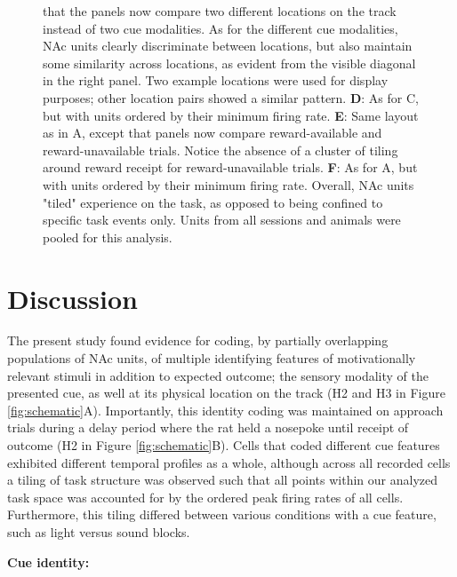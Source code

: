 \documentclass[11pt]{article}
\newcommand{\bsf}[1]{\textbf{#1}}
\begin{document}
{\begin{figure}[h]
{  that the panels now compare two different locations on the track instead of
  two cue modalities. As for the different cue modalities, NAc units clearly
  discriminate between locations, but also maintain some similarity across
  locations, as evident from the visible diagonal in the right panel. Two
  example locations were used for display purposes; other location pairs showed
  a similar pattern. \bsf{D}: As for C, but with units ordered by their minimum
  firing rate. \bsf{E}: Same layout as in A, except that panels now compare
  reward-available and reward-unavailable trials. Notice the absence of a
  cluster of tiling around reward receipt for reward-unavailable
  trials. \bsf{F}: As for A, but with units ordered by their minimum firing
  rate. Overall, NAc units "tiled" experience on the task, as opposed to being
  confined to specific task events only. Units from all sessions and animals
  were pooled for this analysis.}
\label{fig:NP_tiling}
\end{figure}

\section*{Discussion}

The present study found evidence for coding, by partially overlapping populations of NAc units, of multiple identifying features of motivationally relevant stimuli in addition to expected outcome; the sensory modality of the presented cue, as well at its physical location on the track (H2 and H3 in Figure \ref{fig:schematic}A). Importantly, this identity coding was maintained on approach trials during a delay period where the rat held a nosepoke until receipt of outcome (H2 in Figure \ref{fig:schematic}B). Cells that coded different cue features exhibited different temporal profiles as a whole, although across all recorded cells a tiling of task structure was observed such that all points within our analyzed task space was accounted for by the ordered peak firing rates of all cells. Furthermore, this tiling differed between various conditions with a cue feature, such as light versus sound blocks. 

{\bf Cue identity:}

}
\end{document}
